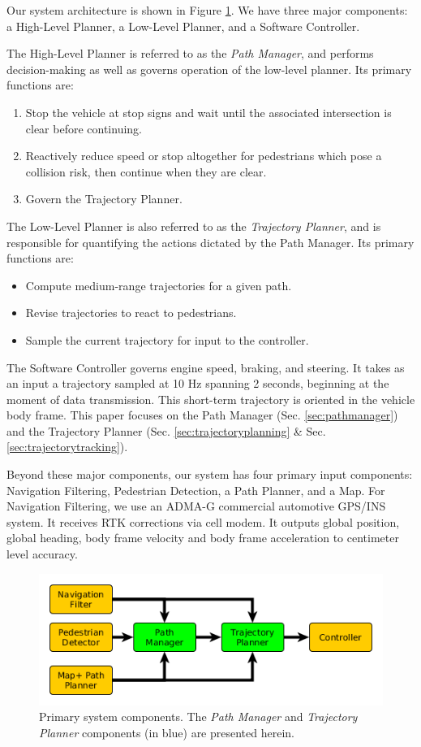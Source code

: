 \documentclass[letterpaper, 10 pt, conference]{ieeeconf}  %
\begin{document}
Our system architecture is shown in Figure \ref{fig:addreact}. We have three major components: a High-Level Planner, a Low-Level Planner, and a Software Controller.

The High-Level Planner is referred to as the {\it Path Manager}, and performs decision-making as well as governs operation of the low-level planner.
Its primary functions are:
\begin{enumerate}
  \item Stop the vehicle at stop signs and wait until the associated intersection is clear before continuing.
  \item Reactively reduce speed or stop altogether for pedestrians which pose a collision risk, then continue when they are clear.
  \item Govern the Trajectory Planner.
\end{enumerate}
The Low-Level Planner is also referred to as the {\it Trajectory Planner}, and is responsible for quantifying the actions dictated by the Path Manager.
Its primary functions are:
\begin{itemize}
  \item Compute medium-range trajectories for a given path.
  \item Revise trajectories to react to pedestrians.
  \item Sample the current trajectory for input to the controller.
\end{itemize}

The Software Controller governs engine speed, braking, and steering.
It takes as an input a trajectory sampled at 10 Hz spanning 2 seconds, beginning at the moment of data transmission.
This short-term trajectory is oriented in the vehicle body frame.
This paper focuses on the Path Manager (Sec. \ref{sec:pathmanager}) and the Trajectory Planner (Sec. \ref{sec:trajectoryplanning} \& Sec. \ref{sec:trajectorytracking}).


Beyond these major components, our system has four primary input components: Navigation Filtering, Pedestrian Detection, a Path Planner, and a Map.
For Navigation Filtering, we use an ADMA-G  commercial automotive GPS/INS system.
It receives RTK corrections via cell modem.
It outputs global position, global heading, body frame velocity and body frame acceleration to centimeter level accuracy.

\begin{figure}[tb]
  \centering
  \includegraphics[width=1.0\columnwidth]{graphics/MissingReactionPiece2.png}
  \caption{
    Primary system components. The {\it Path Manager} and {\it Trajectory Planner} components (in blue) are presented herein.
  }
  \label{fig:addreact}
\end{figure}
\end{document}
